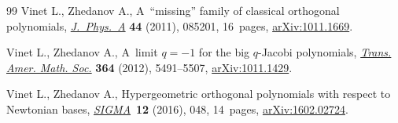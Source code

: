 \begin{thebibliography}{99}
Vinet L., Zhedanov A., A~``missing'' family of classical orthogonal
 polynomials,
 \href{https://doi.org/10.1088/1751-8113/44/8/085201}{\textit{J.~Phys.~A}}
 \textbf{44} (2011), 085201, 16~pages,
 \href{http://arxiv.org/abs/1011.1669}{arXiv:1011.1669}.

Vinet L., Zhedanov A., A~limit {$q=-1$} for the big {$q$}-{J}acobi polynomials,
 \href{https://doi.org/10.1090/S0002-9947-2012-05539-5}{\textit{Trans. Amer.
 Math. Soc.}} \textbf{364} (2012), 5491--5507,
 \href{http://arxiv.org/abs/1011.1429}{arXiv:1011.1429}.

Vinet L., Zhedanov A., Hypergeometric orthogonal polynomials with respect to
 {N}ewtonian bases,
 \href{https://doi.org/10.3842/SIGMA.2016.048}{\textit{SIGMA}}~\textbf{12}
 (2016), 048, 14~pages,
 \href{http://arxiv.org/abs/1602.02724}{arXiv:1602.02724}.

\end{thebibliography}
